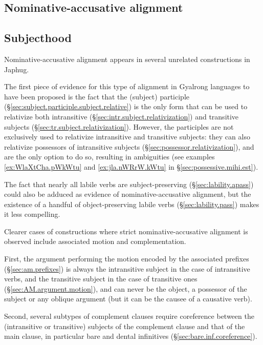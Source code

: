 \subsection{Nominative-accusative alignment}

 \subsection{Subjecthood}
Nominative-accusative alignment appears in several unrelated constructions in Japhug. 

The first piece of evidence for this type of alignment in Gyalrong languages to have been proposed \citep{jackson03caodeng} is the fact that the  (subject) participle (§\ref{sec:subject.participle.subject.relative}) is the only form that can be used to relativize both intransitive (§\ref{sec:intr.subject.relativization}) and transitive subjects (§\ref{sec:tr.subject.relativization}). However, the   participles are not exclusively used to relativize intransitive and transitive subjects: they can also relativize possessors of intransitive subjects (§\ref{sec:possessor.relativization}), and are the only option to do so, resulting in ambiguities (see examples \ref{ex:WlaXtCha.pWkWtu} and \ref{ex:jla.nWRrW.kWtu} in §\ref{sec:possessive.mihi.est}).

 The fact that nearly all labile verbs are subject-preserving (§\ref{sec:lability.apass})  could also be adduced as evidence of nominative-accusative alignment, but the existence of a handful of  object-preserving labile verbs (§\ref{sec:lability.pass}) makes it less compelling.
 
 Clearer cases of constructions where strict nominative-accusative alignment is observed include associated motion and complementation.
 
First, the argument performing the motion encoded by the associated prefixes (§\ref{sec:am.prefixes}) is always the intransitive subject in the case of intransitive verbs, and the transitive subject in the case of transitive ones (§\ref{sec:AM.argument.motion}), and can never be the object, a possessor of the subject or any oblique argument (but it can be the causee of a causative verb).
 
 Second, several subtypes of complement clauses require coreference between the (intransitive or transitive) subjects of the complement clause and that of the main clause, in particular bare and dental infinitives (§\ref{sec:bare.inf.coreference}).
 
